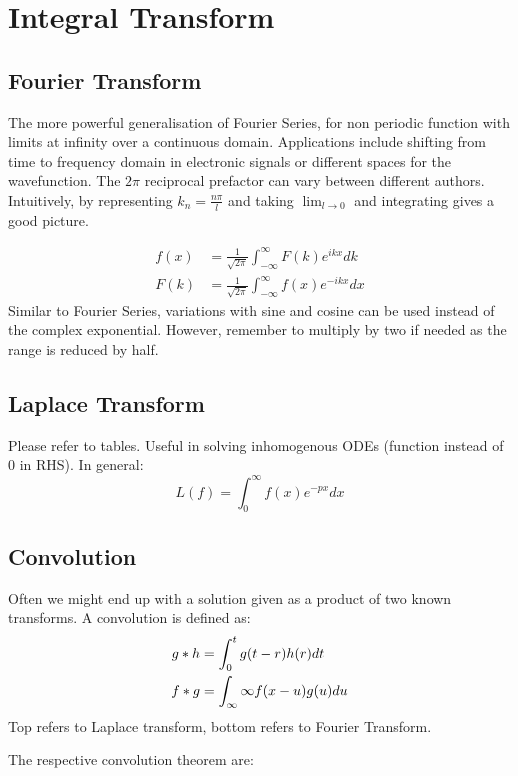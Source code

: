 \documentclass[12pt]{article}
\begin{document}
\section{Integral Transform}

\subsection{Fourier Transform}

The more powerful generalisation of Fourier Series, for non periodic function with limits at infinity over a continuous domain. Applications include shifting from time to frequency domain in electronic signals or different spaces for the wavefunction. The $2\pi$ reciprocal prefactor can vary between different authors. Intuitively, by representing $k_n = \frac{n\pi}{l}$ and taking $\lim_{l \to 0}$ and integrating gives a good picture.

\begin{align*}
f(x) &= \frac{1}{\sqrt{2\pi}}\int^\infty_{-\infty} F(k)e^{ikx} dk \\
F(k) &= \frac{1}{\sqrt{2\pi}}\int^\infty_{-\infty} f(x)e^{-ikx} dx
\end{align*}
Similar to Fourier Series, variations with sine and cosine can be used instead of the complex exponential. However, remember to multiply by two if needed as the range is reduced by half. 




\subsection{Laplace Transform}

Please refer to tables. Useful in solving inhomogenous ODEs (function instead of 0 in RHS). In general:
\[ L(f) = \int_0^\infty f(x) e^{-px} dx \]

\subsection{Convolution}

Often we might end up with a solution given as a product of two known transforms. A convolution is defined as:
\begin{align*}
g*h &= \int_0^t g(t-r)h(r)dt \\
f*g &= \int_{\-\infty}{\infty}f(x-u)g(u)du
\end{align*}
Top refers to Laplace transform, bottom refers to Fourier Transform.

The respective convolution theorem are:
\end{document}

